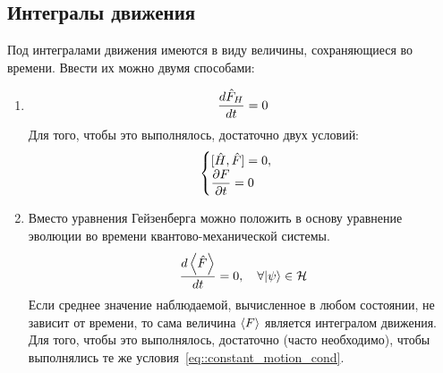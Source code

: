 \subsection{Интегралы движения}
Под интегралами движения имеются в виду величины, сохраняющиеся во времени. Ввести их можно двумя способами:
\begin{enumerate}
  \item
  $$
    \dfrac{d \Hat F_H}{dt} = 0
  $$
  Для того, чтобы это выполнялось, достаточно двух условий:
  \begin{equation}
    \begin{cases}
        [\Hat H, \Hat F] = 0,\\
        \dfrac{\partial F}{\partial t} = 0
    \end{cases}
    \label{eq::constant_motion_cond}  
  \end{equation}
  \item Вместо уравнения Гейзенберга можно положить в основу уравнение эволюции во времени квантово-механической системы.
      $$
        \dfrac{d \left\langle \hat F \right\rangle}{dt} = 0, \quad \forall | \psi \rangle \in \mathcal H
      $$
      Если среднее значение наблюдаемой, вычисленное в любом состоянии, не зависит от времени, то сама величина $ \left\langle F \right\rangle$ является интегралом движения. Для того, чтобы это выполнялось, достаточно (часто необходимо), чтобы выполнялись те же условия~\eqref{eq::constant_motion_cond}.
\end{enumerate}
